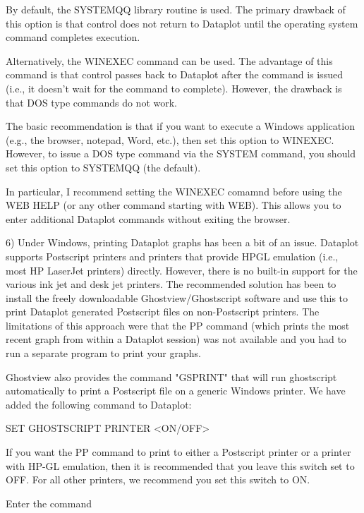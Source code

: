 {       By default, the SYSTEMQQ library routine is used.  The
       primary drawback of this option is that control does
       not return to Dataplot until the operating system
       command completes execution.

       Alternatively, the WINEXEC command can be used.  The
       advantage of this command is that control passes back
       to Dataplot after the command is issued (i.e., it doesn't
       wait for the command to complete).  However, the drawback
       is that DOS type commands do not work.

       The basic recommendation is that if you want to execute
       a Windows application (e.g., the browser, notepad, Word,
       etc.), then set this option to WINEXEC.  However, to issue
       a DOS type command via the SYSTEM command, you should set
       this option to SYSTEMQQ (the default).

       In particular, I recommend setting the WINEXEC comamnd
       before using the WEB HELP (or any other command starting
       with WEB).  This allows you to enter additional Dataplot
       commands without exiting the browser.

 6) Under Windows, printing Dataplot graphs has been a bit of an
    issue.  Dataplot supports Postscript printers and printers
    that provide HPGL emulation (i.e., most HP LaserJet printers)
    directly.  However, there is no built-in support for the
    various ink jet and desk jet printers.  The recommended
    solution has been to install the freely downloadable
    Ghostview/Ghostscript software and use this to print Dataplot
    generated Postscript files on non-Postscript printers.  The
    limitations of this approach were that the PP command (which
    prints the most recent graph from within a Dataplot session)
    was not available and you had to run a separate program to print
    your graphs.

    Ghostview also provides the command "GSPRINT" that will
    run ghostscript automatically to print a Postscript file
    on a generic Windows printer.  We have added the following
    command to Dataplot:

       SET GHOSTSCRIPT PRINTER <ON/OFF>

    If you want the PP command to print to either a Postscript
    printer or a printer with HP-GL emulation, then it is
    recommended that you leave this switch set to OFF.  For all
    other printers, we recommend you set this switch to ON.

    Enter the command

}
